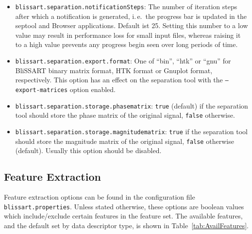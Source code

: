 \begin{itemize}
  \item {\tt blissart.separation.notificationSteps}:
        The number of iteration steps after which a notification is generated,
        i.\,e.\ the progress bar is updated in the septool and Browser
        applications. Default ist 25. Setting this number to a low value may
        result in performance loss for small input files, whereas raising it
        to a high value prevents any progress begin seen over long periods of
        time.
  \item {\tt blissart.separation.export.format}:
        One of ``bin'', ``htk'' or ``gnu'' for BliSSART binary matrix format,
        HTK format or Gnuplot format, respectively. This option has an effect
        on the separation tool with the {\tt --export-matrices} option enabled.
  \item {\tt blissart.separation.storage.phasematrix}:
        {\tt true} (default) if the separation tool should store the phase
        matrix of the original signal, {\tt false} otherwise.
  \item {\tt blissart.separation.storage.magnitudematrix}:
        {\tt true} if the separation tool should store the magnitude
        matrix of the original signal, {\tt false} otherwise (default).
        Usually this option should be disabled.
\end{itemize}


\subsection{Feature Extraction}
\label{section:ConfigFileFex}

Feature extraction options can be found in the configuration file {\tt
  blissart.properties}. Unless stated otherwise, these options are boolean
values which include/exclude certain features in the feature set. The available features, and the default set by data descriptor type, is shown in Table~\ref{tab:AvailFeatures}.

